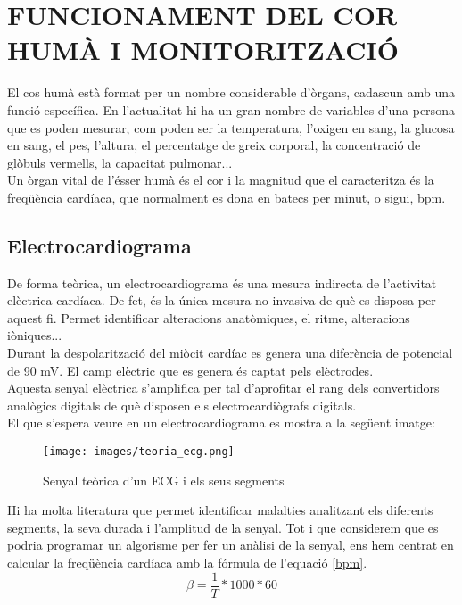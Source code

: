 \chapter{\uppercase{Funcionament del cor humà i monitorització}}

El cos humà està format per un nombre considerable d'òrgans, cadascun amb una funció específica. En l'actualitat hi ha un gran nombre de variables d'una persona que es poden mesurar, com poden ser la temperatura, l'oxigen en sang, la glucosa en sang, el pes, l'altura, el percentatge de greix corporal, la concentració de glòbuls vermells, la capacitat pulmonar...\\
\newline Un òrgan vital de l'ésser humà és el cor i la magnitud que el caracteritza és la freqüència cardíaca, que normalment es dona en batecs per minut, o sigui, bpm.



\section{Electrocardiograma}
De forma teòrica, un electrocardiograma és una mesura indirecta de l'activitat elèctrica cardíaca. De fet, és la única mesura no invasiva de què es disposa per aquest fi. Permet identificar alteracions anatòmiques, el ritme, alteracions iòniques...\\
\newline Durant la despolarització del miòcit cardíac es genera una diferència de potencial de 90 mV. El camp elèctric que es genera és captat pels elèctrodes.\\
\newline Aquesta senyal elèctrica s'amplifica per tal d'aprofitar el rang dels convertidors analògics digitals de què disposen els electrocardiògrafs digitals.\\
\newline El que s'espera veure en un electrocardiograma es mostra a la següent imatge:
\begin{figure}[H]
\begin{center}
\texttt{[image: images/teoria\_ecg.png]}
\end{center}
\caption{Senyal teòrica d'un ECG i els seus segments}
\label{fig: ecg_arduino}
\end{figure}
%
\noindent Hi ha molta literatura que permet identificar malalties analitzant els diferents segments, la seva durada i l'amplitud de la senyal. Tot i que considerem que es podria programar un algorisme per fer un anàlisi de la senyal, ens hem centrat en calcular la freqüència cardíaca amb la fórmula de l'equació \ref{bpm}.
\begin{equation} \label{bpm}
\beta= \frac{1}{T}*1000*60
\end{equation}

